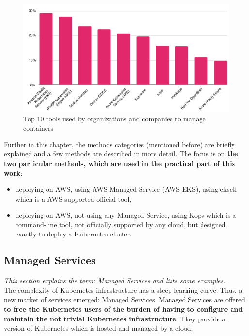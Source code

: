 \begin{figure}[H]
    \centering
    \includegraphics[width=16cm]{figures/cncf-2019-cont-tools.png}
    \captionsetup{justification=centering,margin=2cm}
    \caption{Top 10 tools used by organizations and companies to manage containers\cite{cncf-2019}}
\end{figure}

Further in this chapter, the methods categories (mentioned before) are briefly explained and a few methods are described in more detail. The focus is on \textbf{the two particular methods, which are used in the practical part of this work}:
\begin{itemize}
\item deploying on AWS, using AWS Managed Service (AWS EKS), using eksctl which is a AWS supported official tool,
\item deploying on AWS, not using any Managed Service, using Kops which is a command-line tool, not officially supported by any cloud, but designed exactly to deploy a Kubernetes cluster.
\end{itemize}

\subsection{Managed Services}
\textit{This section explains the term: Managed Services and lists some examples.}
\\

The complexity of Kubernetes infrastructure has a steep learning curve. Thus, a new market of services emerged: Managed Services. Managed Services are offered \textbf{to free the Kubernetes users of the burden of having to configure and maintain the not trivial Kubernetes infrastructure}. They provide a version of Kubernetes which is hosted and managed by a cloud\cite{article-managed}.

